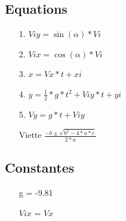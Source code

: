 
\subsection{Equations}
\begin{itemize}
    \item[1.] $Viy = \sin(\alpha) * Vi$
    \item[2.] $Vix = \cos(\alpha) * Vi$ 
    \item[3.] $x = Vx * t + xi$ 
    \item[4.] $y = \frac{1}{2}*g*t^2 + Viy * t + yi $
    \item[5.] $Vy = g*t + Viy$
    \item[Viette] $\frac{-b \pm \sqrt{b^2-4*a*c}}{2*a}$
\end{itemize}

\subsection{Constantes}
\begin{itemize}
    \item[g] = -9.81
    \item[$Vix$] = $Vx$
\end{itemize}